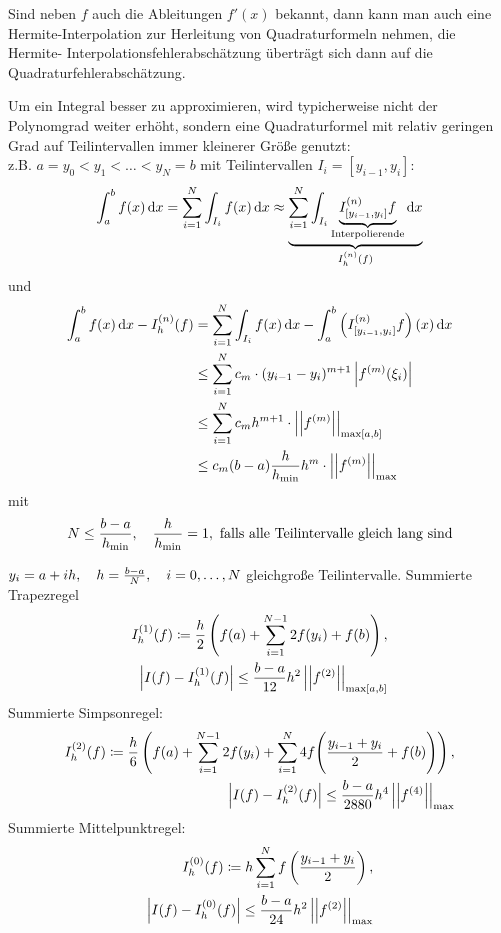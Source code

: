 \documentclass[../Skript.tex]{subfiles}
\begin{document}
\begin{remark}
    Sind neben $f$ auch die Ableitungen $f'(x)$ bekannt, dann kann man 
    auch eine 
    Hermite-Interpolation zur Herleitung von Quadraturformeln nehmen, 
    die Hermite-
    Interpolationsfehlerabschätzung überträgt sich dann auf die 
    Quadraturfehlerabschätzung.
\end{remark}
Um ein Integral besser zu approximieren, wird typicherweise nicht der 
Polynomgrad 
weiter erhöht, sondern eine Quadraturformel mit relativ geringen Grad 
auf 
Teilintervallen immer kleinerer Größe genutzt:\\
z.B.    $a = y_0 < y_1 < \dots < y_N = b$ mit Teilintervallen $I_i = 
[y_{i-1}, 
    y_i]$:\[
        \int_a^b f(x)\mathop{}\!\mathrm{d} x = \sum_{i=1}^N \int_{I_i}f(x)\mathop{}\!\mathrm{d} x\approx
        \underset{I_h^{(n)}(f)}{\underbrace{\displaystyle\sum_{i=1}^N \int_{I_i} 
        \underset{\text{Interpolierende}}
        {\underbrace{I^{(n)}_{[y_{i-1}, y_i]}f}}\mathop{}\!\mathrm{d} x}}
    \] 
    und \begin{align*}
                \int_a^b f(x)\mathop{}\!\mathrm{d} x - I_h^{(n)}(f) &= \displaystyle\sum_{i=1}^N 
                \int_{I_i}f(x)\mathop{}\!\mathrm{d} x - \int_a^b\left(I_{[y_{i-1}, 
                y_i]}^{(n)}f\right)(x)\mathop{}\!\mathrm{d} x\\
                &\leq \displaystyle\sum_{i=1}^N c_m\cdot(y_{i-1}-
                y_i)^{m+1}\left\vert f^{(m)}
                (\xi_i) \right\vert\\
                &\leq \displaystyle\sum_{i=1}^N c_mh^{m+1}\cdot 
                \left\vert\left\vert f^{(m)}\right\vert\right\vert_{\max[a,b]}\\
                &\leq c_m(b-a)\frac{h}
                {h_{\min}}h^{m}\cdot\left\vert\left\vert f^{(m)}\right\vert\right\vert_{\max}
    \end{align*}
    mit \[
        N\leq \frac{b-a}{h_{\min}} , \hspace{1em} \frac{h}{h_{\min}}= 1, 
        \text{ 
        falls 
        alle Teilintervalle gleich lang sind}
    \]
\begin{example}
    $y_i = a+ih, \largespace h=\frac{b-a}{N}, \largespace \igb i 0 N$ 
    gleichgroße 
    Teilintervalle. 
    Summierte Trapezregel \begin{align*}
        I^{(1)}_h(f)\coloneqq \frac{h}{2}\left(f(a)+ \displaystyle\sum_{i=1}^{N-
        1}2f(y_i)+f(b)\right), \\
        \left\vert I(f)-I^{(1)}_h(f) \right\vert\leq \frac{b-a}{12}h^2
        \left\vert \left\vert f^{(2)} \right\vert \right\vert_{\max[a,b]}
    \end{align*}
    Summierte Simpsonregel: \begin{align*}
        I^{(2)}_h(f)\coloneqq \frac{h}{6}\left(f(a)+ \displaystyle\sum_{i=1}^{N-
        1}2f(y_i)+\displaystyle\sum_{i=1}^{N}4f\middle(\frac{y_{i-1}+y_i}
        {2}+f(b)\middle)
        \right), \\
        \left\vert I(f)-I^{(2)}_h(f) \right\vert\leq \frac{b-a}{2880}h^4
        \left\vert \left\vert f^{(4)} \right\vert \right\vert_{\max}
    \end{align*}
    Summierte Mittelpunktregel: \begin{align*}
        I^{(0)}_h(f)\coloneqq h\displaystyle\sum_{i=1}^{N}f\left(\frac{y_{i-1}+y_i}
        {2}\right), \\
        \left\vert I(f)-I^{(0)}_h(f) \right\vert\leq \frac{b-a}{24}h^2
        \left\vert \left\vert f^{(2)} \right\vert \right\vert_{\max}
    \end{align*}
\end{example}
\end{document}

